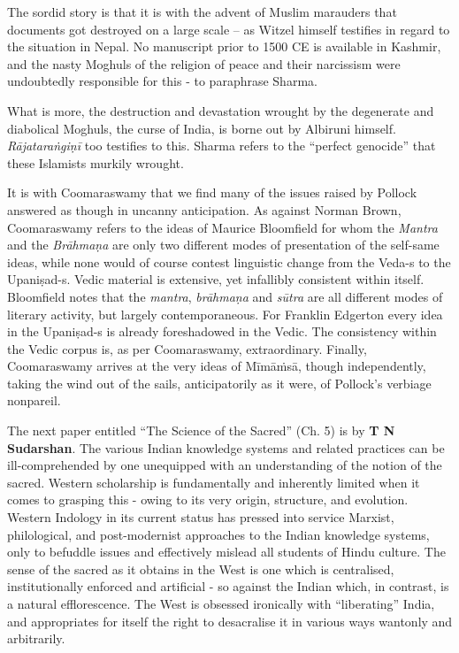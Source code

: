 The sordid story is that it is with the advent of Muslim marauders that documents got destroyed on a large scale – as Witzel himself testifies in regard to the situation in Nepal. No manuscript prior to 1500 CE is available in Kashmir, and the nasty Moghuls of the religion of peace and their narcissism were undoubtedly responsible for this - to paraphrase Sharma.

What is more, the destruction and devastation wrought by the degenerate and diabolical Moghuls, the curse of India, is borne out by Albiruni himself. \textit{Rājataraṅgiṇī} too testifies to this. Sharma refers to the “perfect genocide” that these Islamists murkily wrought.

It is with Coomaraswamy that we find many of the issues raised by Pollock answered as though in uncanny anticipation. As against Norman Brown, Coomaraswamy refers to the ideas of Maurice Bloomfield for whom the \textit{Mantra} and the \textit{Brāhmaṇa} are only two different modes of presentation of the self-same ideas, while none would of course contest linguistic change from the Veda-s to the Upaniṣad-s. Vedic material is extensive, yet infallibly consistent within itself. Bloomfield notes that the \textit{mantra}, \textit{brāhmaṇa} and \textit{sūtra} are all different modes of literary activity, but largely contemporaneous. For Franklin Edgerton every idea in the Upaniṣad-s is already foreshadowed in the Vedic. The consistency within the Vedic corpus is, as per Coomaraswamy, extraordinary. Finally, Coomaraswamy arrives at the very ideas of Mīmāṁsā, though independently, taking the wind out of the sails, anticipatorily as it were, of Pollock's verbiage nonpareil. 

The next paper entitled “The Science of the Sacred” (Ch. 5) is by \textbf{T N Sudarshan}. The various Indian knowledge systems and related practices can be ill-comprehended by one unequipped with an understanding of the notion of the sacred. Western scholarship is fundamentally and inherently limited when it comes to grasping this - owing to its very origin, structure, and evolution. Western Indology in its current status has pressed into service Marxist, philological, and post-modernist approaches to the Indian knowledge systems, only to befuddle issues and effectively mislead all students of Hindu culture. The sense of the sacred as it obtains in the West is one which is centralised, institutionally enforced and artificial - so against the Indian which, in contrast, is a natural efflorescence. The West is obsessed ironically with “liberating” India, and appropriates for itself the right to desacralise it in various ways wantonly and arbitrarily.

